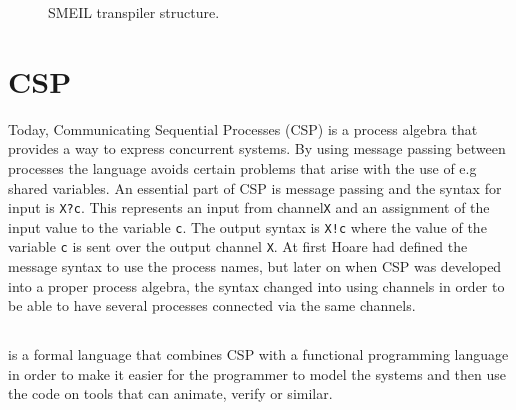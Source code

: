 \begin{figure}[!ht]
  \centering
  \caption{SMEIL transpiler structure.}
  \label{fig:smeil_transpiler}
\end{figure}

\section{CSP}
Today, Communicating Sequential Processes (CSP) is a process algebra that provides a way to express concurrent systems. By using message passing between processes the language avoids certain problems that arise with the use of e.g shared variables. An essential part of CSP is message passing and the syntax for input is \texttt{X?c}. This represents an input from channel\texttt{X} and an assignment of the input value to the variable \texttt{c}. The output syntax is \texttt{X!c} where the value of the variable \texttt{c} is sent over the output channel \texttt{X}. At first Hoare had defined the message syntax to use the process names, but later on when CSP was developed into a proper process algebra, the syntax changed into using channels in order to be able to have several processes connected via the same channels. %

\subsection{\cspm{}}
\cspm{} is a formal language that combines CSP with a functional programming language in order to make it easier for the programmer to model the systems and then use the code on tools that can animate, verify or similar.



